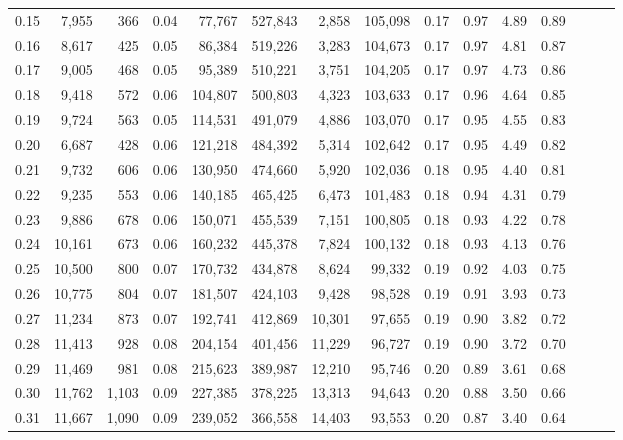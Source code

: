 \begin{tabular}{rrrrrrrrrrrrrrr}
0.15 &   7,955 &    366 &  0.04 &   77,767 &  527,843 &    2,858 &  105,098 &  0.17 &  0.97 &  4.89 &      0.89 \\
0.16 &   8,617 &    425 &  0.05 &   86,384 &  519,226 &    3,283 &  104,673 &  0.17 &  0.97 &  4.81 &      0.87 \\
0.17 &   9,005 &    468 &  0.05 &   95,389 &  510,221 &    3,751 &  104,205 &  0.17 &  0.97 &  4.73 &      0.86 \\
0.18 &   9,418 &    572 &  0.06 &  104,807 &  500,803 &    4,323 &  103,633 &  0.17 &  0.96 &  4.64 &      0.85 \\
0.19 &   9,724 &    563 &  0.05 &  114,531 &  491,079 &    4,886 &  103,070 &  0.17 &  0.95 &  4.55 &      0.83 \\
0.20 &   6,687 &    428 &  0.06 &  121,218 &  484,392 &    5,314 &  102,642 &  0.17 &  0.95 &  4.49 &      0.82 \\
0.21 &   9,732 &    606 &  0.06 &  130,950 &  474,660 &    5,920 &  102,036 &  0.18 &  0.95 &  4.40 &      0.81 \\
0.22 &   9,235 &    553 &  0.06 &  140,185 &  465,425 &    6,473 &  101,483 &  0.18 &  0.94 &  4.31 &      0.79 \\
0.23 &   9,886 &    678 &  0.06 &  150,071 &  455,539 &    7,151 &  100,805 &  0.18 &  0.93 &  4.22 &      0.78 \\
0.24 &  10,161 &    673 &  0.06 &  160,232 &  445,378 &    7,824 &  100,132 &  0.18 &  0.93 &  4.13 &      0.76 \\
0.25 &  10,500 &    800 &  0.07 &  170,732 &  434,878 &    8,624 &   99,332 &  0.19 &  0.92 &  4.03 &      0.75 \\
0.26 &  10,775 &    804 &  0.07 &  181,507 &  424,103 &    9,428 &   98,528 &  0.19 &  0.91 &  3.93 &      0.73 \\
0.27 &  11,234 &    873 &  0.07 &  192,741 &  412,869 &   10,301 &   97,655 &  0.19 &  0.90 &  3.82 &      0.72 \\
0.28 &  11,413 &    928 &  0.08 &  204,154 &  401,456 &   11,229 &   96,727 &  0.19 &  0.90 &  3.72 &      0.70 \\
0.29 &  11,469 &    981 &  0.08 &  215,623 &  389,987 &   12,210 &   95,746 &  0.20 &  0.89 &  3.61 &      0.68 \\
0.30 &  11,762 &  1,103 &  0.09 &  227,385 &  378,225 &   13,313 &   94,643 &  0.20 &  0.88 &  3.50 &      0.66 \\
0.31 &  11,667 &  1,090 &  0.09 &  239,052 &  366,558 &   14,403 &   93,553 &  0.20 &  0.87 &  3.40 &      0.64 \\

\end{tabular}
